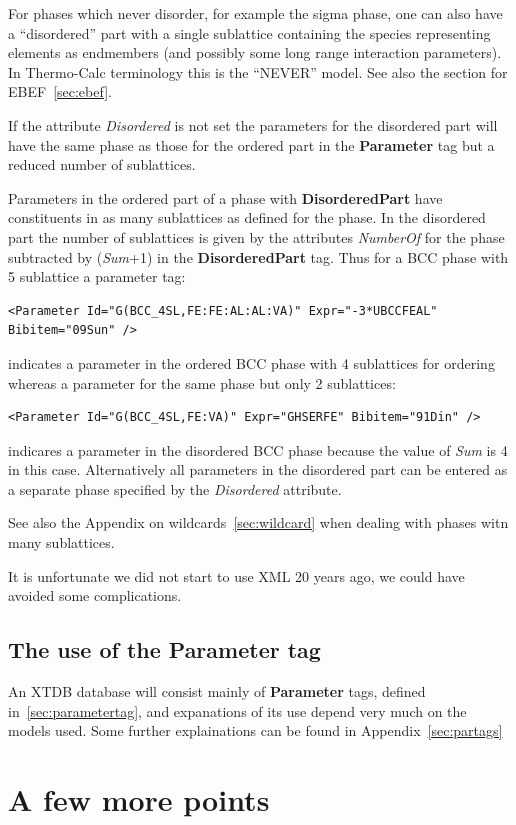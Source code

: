 \documentclass{article}
\begin{document}
For phases which never disorder, for example the sigma phase, one can
also have a ``disordered'' part with a single sublattice containing
the species representing elements as endmembers (and possibly some
long range interaction parameters).  In Thermo-Calc terminology this
is the ``NEVER'' model.  See also the section for EBEF~\ref{sec:ebef}.

If the attribute {\em Disordered} is not set the parameters for the
disordered part will have the same phase as those for the ordered part
in the {\bf Parameter} tag but a reduced number of sublattices.

Parameters in the ordered part of a phase with {\bf DisorderedPart}
have constituents in as many sublattices as defined for the phase.  In
the disordered part the number of sublattices is given by the
attributes {\em NumberOf} for the phase subtracted by ({\em Sum}+1) in
the {\bf DisorderedPart} tag.  Thus for a BCC phase with 5 sublattice
a parameter tag:
\begin{verbatim}
<Parameter Id="G(BCC_4SL,FE:FE:AL:AL:VA)" Expr="-3*UBCCFEAL" Bibitem="09Sun" />
\end{verbatim}
indicates a parameter in the ordered BCC phase with 4 sublattices for
ordering whereas a parameter for the same phase but only 2 sublattices:
\begin{verbatim}
<Parameter Id="G(BCC_4SL,FE:VA)" Expr="GHSERFE" Bibitem="91Din" />
\end{verbatim}
indicares a parameter in the disordered BCC phase because the value of
{\em Sum} is 4 in this case.  Alternatively all parameters in the
disordered part can be entered as a separate phase specified by the
{\em Disordered} attribute.

See also the Appendix on wildcards~\ref{sec:wildcard} when dealing
with phases witn many sublattices.

It is unfortunate we did not start to use XML 20 years ago, we could
have avoided some complications.

\subsection{The use of the Parameter tag}

An XTDB database will consist mainly of {\bf Parameter} tags, defined
in~\ref{sec:parametertag}, and expanations of its use depend very much
on the models used.  Some further explainations can be found in
Appendix~\ref{sec:partags}

\section{A few more points}\label{sec:points}
\end{document}
